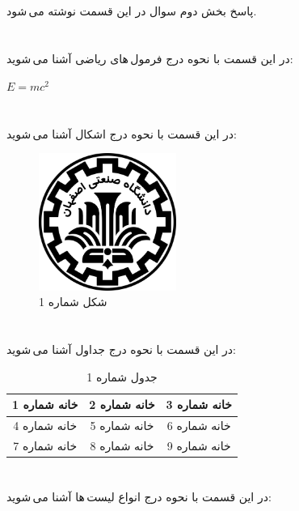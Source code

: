 \documentclass{article}
\begin{document}
\subsection{}
پاسخ بخش دوم سوال در این قسمت نوشته می\,شود.

\section{}
در این قسمت با نحوه درج فرمول\,های ریاضی آشنا می\,شوید:
\begin{center}
$E = m{c}^{2}$
\end{center}

\section{}
در این قسمت با نحوه درج اشکال آشنا می\,شوید:
\begin{figure}[ht]
    \centering
    \includegraphics[width=0.4\textwidth]{figures/IUT Logo.png}
    \caption{شکل شماره 1}
    \label{fig:fig1}
\end{figure}

\section{}
در این قسمت با نحوه درج جداول آشنا می\,شوید:
\begin{table}[ht]
    \centering
    \begin{tabular}{|c|c|c|}
    \hline
    خانه شماره 1 & خانه شماره 2 & خانه شماره 3\\
    \hline
    خانه شماره 4 & خانه شماره 5 & خانه شماره 6\\
    \hline
    خانه شماره 7 & خانه شماره 8 & خانه شماره 9\\
    \hline
    \end{tabular}
    \caption{جدول شماره 1}
    \label{tab:tab1}
\end{table}

\section{}
در این قسمت با نحوه درج انواع لیست\,ها آشنا می\,شوید:
\end{document}
